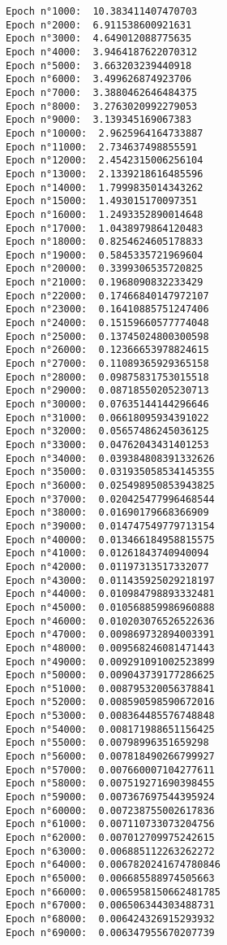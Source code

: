 \documentclass[11pt]{article}
\begin{document}
    \begin{Verbatim}[commandchars=\\\{\}]
Epoch n°1000:  10.383411407470703
Epoch n°2000:  6.911538600921631
Epoch n°3000:  4.649012088775635
Epoch n°4000:  3.9464187622070312
Epoch n°5000:  3.663203239440918
Epoch n°6000:  3.499626874923706
Epoch n°7000:  3.3880462646484375
Epoch n°8000:  3.2763020992279053
Epoch n°9000:  3.139345169067383
Epoch n°10000:  2.9625964164733887
Epoch n°11000:  2.734637498855591
Epoch n°12000:  2.4542315006256104
Epoch n°13000:  2.1339218616485596
Epoch n°14000:  1.7999835014343262
Epoch n°15000:  1.493015170097351
Epoch n°16000:  1.2493352890014648
Epoch n°17000:  1.0438979864120483
Epoch n°18000:  0.8254624605178833
Epoch n°19000:  0.5845335721969604
Epoch n°20000:  0.3399306535720825
Epoch n°21000:  0.1968090832233429
Epoch n°22000:  0.17466840147972107
Epoch n°23000:  0.16410885751247406
Epoch n°24000:  0.15159660577774048
Epoch n°25000:  0.13745024800300598
Epoch n°26000:  0.12366653978824615
Epoch n°27000:  0.11089365929365158
Epoch n°28000:  0.09875831753015518
Epoch n°29000:  0.08718550205230713
Epoch n°30000:  0.07635144144296646
Epoch n°31000:  0.06618095934391022
Epoch n°32000:  0.05657486245036125
Epoch n°33000:  0.04762043431401253
Epoch n°34000:  0.039384808391332626
Epoch n°35000:  0.031935058534145355
Epoch n°36000:  0.025498950853943825
Epoch n°37000:  0.020425477996468544
Epoch n°38000:  0.01690179668366909
Epoch n°39000:  0.014747549779713154
Epoch n°40000:  0.013466184958815575
Epoch n°41000:  0.01261843740940094
Epoch n°42000:  0.01197313517332077
Epoch n°43000:  0.011435925029218197
Epoch n°44000:  0.010984798893332481
Epoch n°45000:  0.010568859986960888
Epoch n°46000:  0.010203076526522636
Epoch n°47000:  0.009869732894003391
Epoch n°48000:  0.009568246081471443
Epoch n°49000:  0.009291091002523899
Epoch n°50000:  0.009043739177286625
Epoch n°51000:  0.008795320056378841
Epoch n°52000:  0.008590598590672016
Epoch n°53000:  0.008364485576748848
Epoch n°54000:  0.008171988651156425
Epoch n°55000:  0.00798996351659298
Epoch n°56000:  0.007818490266799927
Epoch n°57000:  0.007660007104277611
Epoch n°58000:  0.007519271690398455
Epoch n°59000:  0.007367697544395924
Epoch n°60000:  0.007238755002617836
Epoch n°61000:  0.007110733073204756
Epoch n°62000:  0.007012709975242615
Epoch n°63000:  0.006885112263262272
Epoch n°64000:  0.0067820241674780846
Epoch n°65000:  0.006685588974505663
Epoch n°66000:  0.0065958150662481785
Epoch n°67000:  0.006506344303488731
Epoch n°68000:  0.006424326915293932
Epoch n°69000:  0.006347955670207739

\end{Verbatim}
\end{document}
